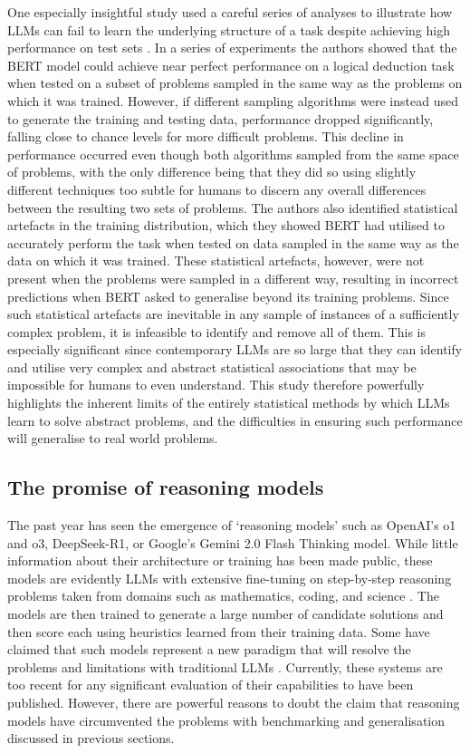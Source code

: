 \documentclass{article}
\begin{document}
One especially insightful study used a careful series of analyses to illustrate how LLMs can fail to learn the underlying structure of a task despite achieving high performance on test sets \citep{zhang2023paradox}. In a series of experiments the authors showed that the BERT model could achieve near perfect performance on a logical deduction task when tested on a subset of problems sampled in the same way as the problems on which it was trained. However, if different sampling algorithms were instead used to generate the training and testing data, performance dropped significantly, falling close to chance levels for more difficult problems. This decline in performance occurred even though both algorithms sampled from the same space of problems, with the only difference being that they did so using slightly different techniques too subtle for humans to discern any overall differences between the resulting two sets of problems. The authors also identified statistical artefacts in the training distribution, which they showed BERT had utilised to accurately perform the task when tested on data sampled in the same way as the data on which it was trained. These statistical artefacts, however, were not present when the problems were sampled in a different way, resulting in incorrect predictions when BERT asked to generalise beyond its training problems. Since such statistical artefacts are inevitable in any sample of instances of a sufficiently complex problem, it is infeasible to identify and remove all of them. This is especially significant since contemporary LLMs are so large that they can identify and utilise very complex and abstract statistical associations that may be impossible for humans to even understand. This study therefore powerfully highlights the inherent limits of the entirely statistical methods by which LLMs learn to solve abstract problems, and the difficulties in ensuring such performance will generalise to real world problems.

\subsection{The promise of reasoning models}

The past year has seen the emergence of ‘reasoning models’ such as OpenAI’s o1 and o3, DeepSeek-R1, or Google’s Gemini 2.0 Flash Thinking model. While little information about their architecture or training has been made public, these models are evidently LLMs with extensive fine-tuning on step-by-step reasoning problems taken from domains such as mathematics, coding, and science \citep{guo2025deepseek}. The models are then trained to generate a large number of candidate solutions and then score each using heuristics learned from their training data. Some have claimed that such models represent a new paradigm that will resolve the problems and limitations with traditional LLMs \citep{gold2024, todd2025teaching}. Currently, these systems are too recent for any significant evaluation of their capabilities to have been published. However, there are powerful reasons to doubt the claim that reasoning models have circumvented the problems with benchmarking and generalisation discussed in previous sections.
\end{document}

